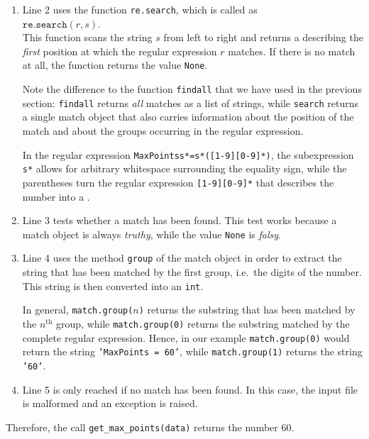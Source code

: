 \begin{enumerate}
\item Line 2 uses the function \texttt{re.search}, which is called as
      \\[0.2cm]
      \hspace*{1.3cm}
      $\texttt{re.search}(r, s)$.
      \\[0.2cm]
      This function scans the string $s$ from left to right and returns a  describing the
      \emph{first} position at which the regular expression $r$ matches.  If there is no match at all, the
      function returns the value \texttt{None}.

      Note the difference to the function \texttt{findall} that we have used in the previous section:
      \texttt{findall} returns \emph{all} matches as a list of strings, while \texttt{search} returns a single
      match object that also carries information about the position of the match and about the groups occurring
      in the regular expression.

      In the regular expression \texttt{MaxPointss*=s*([1-9][0-9]*)}, the subexpression
      \texttt{s*} allows for arbitrary whitespace surrounding the equality sign, while the
      parentheses turn the regular expression \texttt{[1-9][0-9]*} that describes the number into a
      .
\item Line 3 tests whether a match has been found.  This test works because a match object is always
      \emph{truthy}, while the value \texttt{None} is \emph{falsy}.
\item Line 4 uses the method \texttt{group} of the match object in order to extract
      the string that has been matched by the first group, i.e.\ the digits of the number.  This string is then
      converted into an \texttt{int}.

      In general, \texttt{match.group($n$)} returns the substring that has been matched by the $n^{\mathrm{th}}$
      group, while \texttt{match.group(0)} returns the substring matched by the complete regular expression.
      Hence, in our example \texttt{match.group(0)} would return the string \texttt{'MaxPoints = 60'}, while
      \texttt{match.group(1)} returns the string \texttt{'60'}.
\item Line 5 is only reached if no match has been found.  In this case, the input file is malformed and an
      exception is raised.
\end{enumerate}
Therefore, the call \texttt{get\_max\_points(data)} returns the number $60$.

